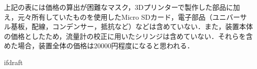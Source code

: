上記の表には価格の算出が困難なマスク，3Dプリンターで製作した部品に加え，元々所有していたものを使用したMicro SDカード，電子部品（ユニバーサル基板，配線，コンデンサー，抵抗など）などは含めていない．また，装置本体の価格としたため，流量計の校正に用いたシリンジは含めていない．それらを含めた場合，装置全体の価格は20000円程度になると思われる．

\expandafter\ifx\csname ifdraft\endcsname\relax
  
\fi
